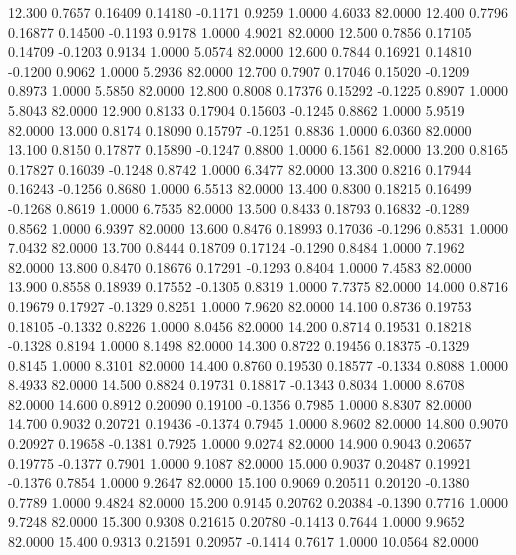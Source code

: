   12.300   0.7657   0.16409   0.14180  -0.1171   0.9259   1.0000   4.6033  82.0000
  12.400   0.7796   0.16877   0.14500  -0.1193   0.9178   1.0000   4.9021  82.0000
  12.500   0.7856   0.17105   0.14709  -0.1203   0.9134   1.0000   5.0574  82.0000
  12.600   0.7844   0.16921   0.14810  -0.1200   0.9062   1.0000   5.2936  82.0000
  12.700   0.7907   0.17046   0.15020  -0.1209   0.8973   1.0000   5.5850  82.0000
  12.800   0.8008   0.17376   0.15292  -0.1225   0.8907   1.0000   5.8043  82.0000
  12.900   0.8133   0.17904   0.15603  -0.1245   0.8862   1.0000   5.9519  82.0000
  13.000   0.8174   0.18090   0.15797  -0.1251   0.8836   1.0000   6.0360  82.0000
  13.100   0.8150   0.17877   0.15890  -0.1247   0.8800   1.0000   6.1561  82.0000
  13.200   0.8165   0.17827   0.16039  -0.1248   0.8742   1.0000   6.3477  82.0000
  13.300   0.8216   0.17944   0.16243  -0.1256   0.8680   1.0000   6.5513  82.0000
  13.400   0.8300   0.18215   0.16499  -0.1268   0.8619   1.0000   6.7535  82.0000
  13.500   0.8433   0.18793   0.16832  -0.1289   0.8562   1.0000   6.9397  82.0000
  13.600   0.8476   0.18993   0.17036  -0.1296   0.8531   1.0000   7.0432  82.0000
  13.700   0.8444   0.18709   0.17124  -0.1290   0.8484   1.0000   7.1962  82.0000
  13.800   0.8470   0.18676   0.17291  -0.1293   0.8404   1.0000   7.4583  82.0000
  13.900   0.8558   0.18939   0.17552  -0.1305   0.8319   1.0000   7.7375  82.0000
  14.000   0.8716   0.19679   0.17927  -0.1329   0.8251   1.0000   7.9620  82.0000
  14.100   0.8736   0.19753   0.18105  -0.1332   0.8226   1.0000   8.0456  82.0000
  14.200   0.8714   0.19531   0.18218  -0.1328   0.8194   1.0000   8.1498  82.0000
  14.300   0.8722   0.19456   0.18375  -0.1329   0.8145   1.0000   8.3101  82.0000
  14.400   0.8760   0.19530   0.18577  -0.1334   0.8088   1.0000   8.4933  82.0000
  14.500   0.8824   0.19731   0.18817  -0.1343   0.8034   1.0000   8.6708  82.0000
  14.600   0.8912   0.20090   0.19100  -0.1356   0.7985   1.0000   8.8307  82.0000
  14.700   0.9032   0.20721   0.19436  -0.1374   0.7945   1.0000   8.9602  82.0000
  14.800   0.9070   0.20927   0.19658  -0.1381   0.7925   1.0000   9.0274  82.0000
  14.900   0.9043   0.20657   0.19775  -0.1377   0.7901   1.0000   9.1087  82.0000
  15.000   0.9037   0.20487   0.19921  -0.1376   0.7854   1.0000   9.2647  82.0000
  15.100   0.9069   0.20511   0.20120  -0.1380   0.7789   1.0000   9.4824  82.0000
  15.200   0.9145   0.20762   0.20384  -0.1390   0.7716   1.0000   9.7248  82.0000
  15.300   0.9308   0.21615   0.20780  -0.1413   0.7644   1.0000   9.9652  82.0000
  15.400   0.9313   0.21591   0.20957  -0.1414   0.7617   1.0000  10.0564  82.0000
